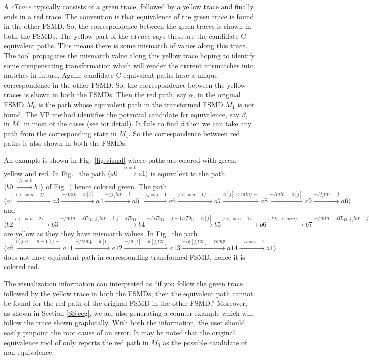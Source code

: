 A $cTrace$ typically consists of a green trace, followed by a yellow trace and finally ends in a red trace. The convention is that equivalence of the green trace is found in the other FSMD. 
So, the correspondence between the green traces is shown in both the FSMDs. 
The yellow part of the $cTrace$ says these are the candidate C-equivalent paths. This means there is some mismatch of values along this trace. The tool propagates the mismatch value along this yellow trace hoping to identify some compensating transformation which will render the current mismatches into matches in future. Again, candidate C-equivalent paths have a unique correspondence in the other FSMD. So, the correspondence between the yellow traces is shown in both the FSMDs. Then the red path, say $\alpha$, in the  original FSMD $M_0$ is the path whose equivalent path in the transformed FSMD $M_1$ is not found. The VP method identifies the potential candidate  for equivalence, say $\beta$, in $M_1$ in most of the cases (see \cite{tcad14} for detail). It fails to find $\beta$ then we can take any path from the corresponding state in $M_1$. So the correspondence between red paths is also shown in both the FSMDs. 

An example is shown in Fig.~\ref{fig:visual} where paths are colored with green, yellow and red. In Fig.~ the path $\langle a0\xrightarrow{-/i=0}a1 \rangle$  is equivalent to the path $\langle b0\xrightarrow{-/b=0}b1 \rangle$ of Fig.~) hence colored green. The path $\langle a1\xrightarrow{i<=n-2/-}a3\xrightarrow{-/min=a[i]}a4\xrightarrow{-/j_star=i}a5\xrightarrow{-/j=j+1}a6\xrightarrow{j<=n-1/-}a7\xrightarrow{a[j]<min/-}a8\xrightarrow{-/min=a[j]}a9\xrightarrow{-/j_star=j}a6 \rangle$ and $\langle b2\xrightarrow{i<=n-2/-}b3\xrightarrow{-/min=sT7_11,j_star=i,j=sT6_12}b4\xrightarrow{-/sT8_12=j+1,sT9_13=a[j]}b5\xrightarrow{j<=n-1/-}b6\xrightarrow{sT9_13<min/-}b7\xrightarrow{-/min=sT9_13,j_star=j,j=sT8_12}b8\xrightarrow{-sT8_12=j+1,sT9_13=a[j]}b5 \rangle$ are yellow as they they have mismatch values. In Fig~ the path $\langle a6\xrightarrow{!(j<=n-1)/-}a11\xrightarrow{-/temp=a[i]}a12\xrightarrow{-/a[i]=a[j_star]}a13\xrightarrow{-/a[j_star]=temp}a14\xrightarrow{-/i=i+1}a1 \rangle$ does not have equivalent path in corresponding transformed FSMD, hence it is colored red.


The visualization information can interpreted as ``if you follow the green trace followed by the yellow trace in both the FSMDs, then the equivalent path cannot be found for the red path of the original FSMD in the other FSMD.'' Moreover, as shown in Section \ref{SS:ceg}, we are also generating a counter-example which will follow the trace shown graphically. With both the information, the user should easily pinpoint the root cause of an error. It may be noted that the original equivalence tool of \cite{tcad14} only reports the red path in $M_0$ as the possible candidate of non-equivalence.



